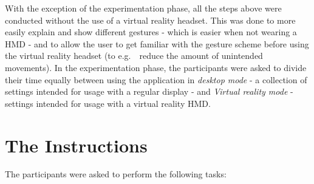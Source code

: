 With the exception of the experimentation phase, all the steps above were conducted without the use of a virtual reality headset. 
This was done to more easily explain and show different gestures - which is easier when not wearing a HMD - and to allow the user to 
get familiar with the gesture scheme before using the virtual reality headset (to e.g.~~reduce the amount of unintended movements).
In the experimentation phase, the participants were asked to divide their time equally between using the application in \textit{desktop mode} 
- a collection of settings intended for usage with a regular display - and \textit{Virtual reality mode} - settings intended for usage with a virtual reality HMD. 

\section{The Instructions}
The participants were asked to perform the following tasks:

